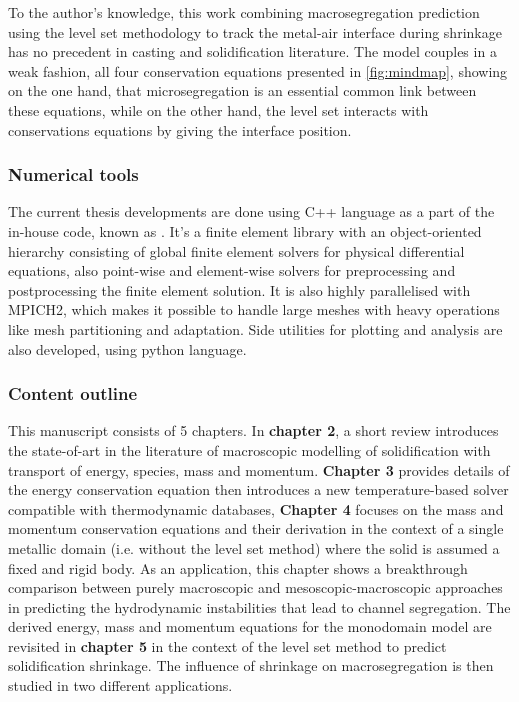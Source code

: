 To the author's knowledge, this work 
combining macrosegregation prediction using the level set methodology to track the metal-air interface during 
shrinkage has no precedent in casting and solidification literature. The model couples in a weak fashion, all four
conservation equations presented in \cref{fig:mindmap}, showing on the one hand, that microsegregation is an essential 
common link between these equations, while on the other hand, the level set interacts with conservations equations by
giving the interface position. 
%
\subsubsection{Numerical tools}
The current thesis developments are done using C++ language as a part of the
in-house code, known as \cimlib \citep{mesri_advanced_2009}. It's a finite element library with an object-oriented hierarchy
consisting of global finite element solvers for physical differential equations, also point-wise and element-wise solvers for 
preprocessing and postprocessing the finite element solution. It is also highly parallelised with MPICH2, which makes it possible
to handle large meshes with heavy operations like mesh partitioning and adaptation. Side utilities for plotting and analysis
are also developed, using python language.

\subsubsection{Content outline}
This manuscript consists of 5 chapters. In \textbf{chapter 2}, a short review introduces the state-of-art in the literature of 
macroscopic modelling of solidification with transport of energy, species, mass and momentum. \textbf{Chapter 3} provides details
of the energy conservation equation then introduces a new temperature-based solver compatible with thermodynamic databases,
\textbf{Chapter 4} focuses on the mass and momentum conservation equations 
and their derivation in the context of a single metallic domain (i.e. without 
the level set method) where the solid is assumed a fixed and rigid body. As an 
application, this chapter shows a breakthrough comparison between purely macroscopic 
and mesoscopic-macroscopic approaches in predicting the hydrodynamic instabilities 
that lead to channel segregation.
The derived energy, mass and momentum equations for the monodomain model are revisited 
in \textbf{chapter 5} in the context of the level set method to predict solidification shrinkage.
The influence of shrinkage on macrosegregation is then studied in two different applications.

